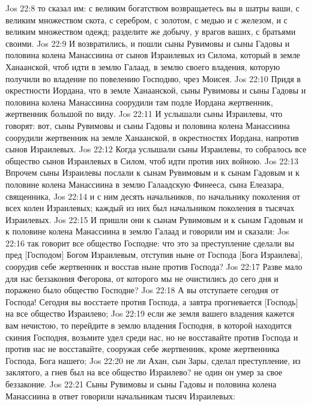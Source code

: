\vs Jos 22:8 то сказал им: с великим богатством возвращаетесь вы в шатры ваши, с великим множеством скота, с серебром, с золотом, с медью и с железом, и с великим множеством одежд; разделите же добычу,  у врагов ваших, с братьями своими.
\vs Jos 22:9 И возвратились, и пошли сыны Рувимовы и сыны Гадовы и половина колена Манассиина от сынов Израилевых из Силома, который в земле Ханаанской, чтоб идти в землю Галаад, в землю своего владения, которую получили во владение по повелению Господню,  чрез Моисея.
\rsbpar\vs Jos 22:10 Придя в окрестности Иордана, что в земле Ханаанской, сыны Рувимовы и сыны Гадовы и половина колена Манассиина соорудили там подле Иордана жертвенник, жертвенник большой по виду.
\vs Jos 22:11 И услышали сыны Израилевы, что говорят: вот, сыны Рувимовы и сыны Гадовы и половина колена Манассиина соорудили жертвенник на земле Ханаанской, в окрестностях Иордана, напротив сынов Израилевых.
\vs Jos 22:12 Когда услышали  сыны Израилевы, то собралось все общество сынов Израилевых в Силом, чтоб идти против них войною.
\vs Jos 22:13 Впрочем сыны Израилевы  послали к сынам Рувимовым и к сынам Гадовым и к половине колена Манассиина в землю Галаадскую Финееса, сына Елеазара, священника,
\vs Jos 22:14 и с ним десять начальников, по начальнику поколения от всех колен Израилевых; каждый из них был начальником поколения в тысячах Израилевых.
\vs Jos 22:15 И пришли они к сынам Рувимовым и к сынам Гадовым и к половине колена Манассиина в землю Галаад и говорили им и сказали:
\vs Jos 22:16 так говорит все общество Господне: что это за преступление сделали вы пред [Господом] Богом Израилевым, отступив ныне от Господа [Бога Израилева], соорудив себе жертвенник и восстав ныне против Господа?
\vs Jos 22:17 Разве мало для нас беззакония Фегорова, от которого мы не очистились до сего дня и  поражено было общество Господне?
\vs Jos 22:18 А вы отступаете сегодня от Господа! Сегодня вы восстаете против Господа, а завтра прогневается [Господь] на все общество Израилево;
\vs Jos 22:19 если же земля вашего владения кажется вам нечистою, то перейдите в землю владения Господня, в которой находится скиния Господня, возьмите удел среди нас, но не восставайте против Господа и против нас не восставайте, сооружая себе жертвенник, кроме жертвенника Господа, Бога нашего;
\vs Jos 22:20 не  ли Ахан, сын Зары, сделал преступление,  из заклятого, а гнев был на все общество Израилево? не один он умер за свое беззаконие.
\vs Jos 22:21 Сыны Рувимовы и сыны Гадовы и половина колена Манассиина в ответ  говорили начальникам тысяч Израилевых:
